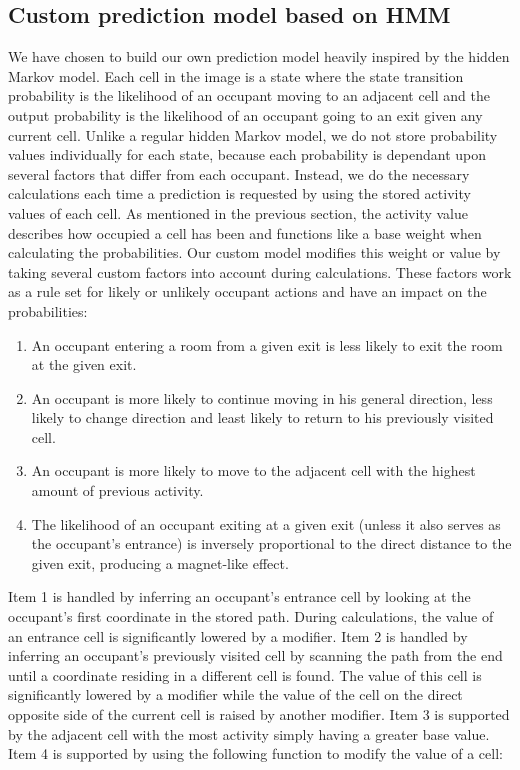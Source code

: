 \subsection{Custom prediction model based on HMM}
\label{ssub:designcustomprediction}
We have chosen to build our own prediction model heavily inspired by the hidden Markov model. Each cell in the image is a state where the state transition probability is the likelihood of an occupant moving to an adjacent cell and the output probability is the likelihood of an occupant going to an exit given any current cell. Unlike a regular hidden Markov model, we do not store probability values individually for each state, because each probability is dependant upon several factors that differ from each occupant. Instead, we do the necessary calculations each time a prediction is requested by using the stored activity values of each cell. As mentioned in the previous section, the activity value describes how occupied a cell has been and functions like a base weight when calculating the probabilities. Our custom model modifies this weight or value by taking several custom factors into account during calculations. These factors work as a rule set for likely or unlikely occupant actions and have an impact on the probabilities:
\begin{enumerate}
\item An occupant entering a room from a given exit is less likely to exit the room at the given exit.
\item An occupant is more likely to continue moving in his general direction, less likely to change direction and least likely to return to his previously visited cell.
\item An occupant is more likely to move to the adjacent cell with the highest amount of previous activity.
\item The likelihood of an occupant exiting at a given exit (unless it also serves as the occupant's entrance) is inversely proportional to the direct distance to the given exit, producing a magnet-like effect. 
\end{enumerate}
Item 1 is handled by inferring an occupant's entrance cell by looking at the occupant's first coordinate in the stored path. During calculations, the value of an entrance cell is significantly lowered by a modifier. Item 2 is handled by inferring an occupant's previously visited cell by scanning the path from the end until a coordinate residing in a different cell is found. The value of this cell is significantly lowered by a modifier while the value of the cell on the direct opposite side of the current cell is raised by another modifier. Item 3 is supported by the adjacent cell with the most activity simply having a greater base value. Item 4 is supported by using the following function to modify the value of a cell: \\
